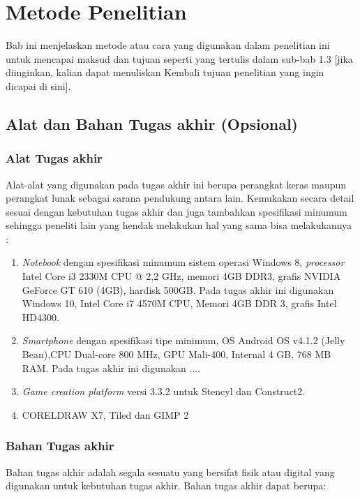 \chapter{Metode Penelitian}

Bab ini menjelaskan metode atau cara yang digunakan dalam penelitian ini untuk 
mencapai maksud dan tujuan seperti yang tertulis dalam sub-bab 1.3 [jika diinginkan, kalian dapat menuliskan Kembali tujuan penelitian yang ingin dicapai di sini].

\section{Alat dan Bahan Tugas akhir (Opsional)}

\subsection{Alat Tugas akhir}



Alat-alat yang digunakan pada tugas akhir ini berupa perangkat keras maupun perangkat lunak sebagai sarana pendukung antara lain. Kemukakan secara detail sesuai dengan kebutuhan tugas akhir dan juga tambahkan spesifikasi minumum sehingga peneliti lain yang hendak melakukan hal yang sama bisa melakukannya :

\begin{enumerate}
	\item \textit{Notebook} dengan spesifikasi minumum sistem operasi Windows 8, \textit{processor} Intel Core i3 2330M CPU @ 2,2 GHz, memori 4GB DDR3, grafis NVIDIA GeForce GT 610 (4GB), hardisk 500GB. Pada tugas akhir ini digunakan Windows 10, Intel Core i7 4570M CPU, Memori 4GB DDR 3, grafis Intel HD4300. 
	\item \textit{Smartphone} dengan spesifikasi tipe minimum, OS Android OS v4.1.2 (Jelly Bean),CPU Dual-core 800 MHz, GPU Mali-400, Internal 4 GB, 768 MB RAM. Pada tugas akhir ini digunakan ....
	\item \textit{Game creation platform} versi 3.3.2 untuk Stencyl dan Construct2.
	\item CORELDRAW X7, Tiled dan GIMP 2
\end{enumerate}

\subsection{Bahan Tugas akhir}

Bahan tugas akhir adalah segala sesuatu yang bersifat fisik atau digital yang digunakan untuk kebutuhan tugas akhir. Bahan tugas akhir dapat berupa:


